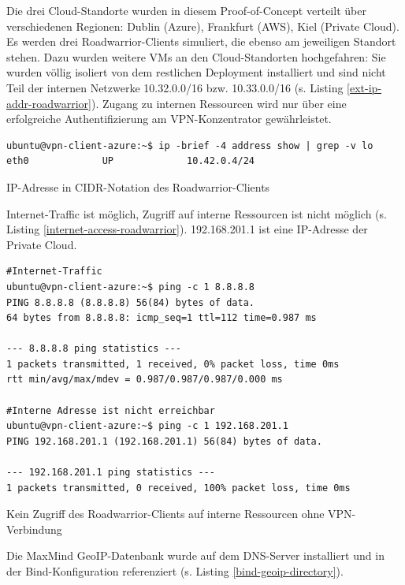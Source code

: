 Die drei Cloud-Standorte wurden in diesem Proof-of-Concept verteilt über verschiedenen Regionen: Dublin (Azure), Frankfurt (AWS), Kiel (Private Cloud). Es werden drei \gls{Roadwarrior}-\gls{Client}s simuliert, die ebenso am jeweiligen Standort stehen. Dazu wurden weitere \gls{VM}s an den Cloud-Standorten hochgefahren: Sie wurden völlig isoliert von dem restlichen \gls{Deployment} installiert und sind nicht Teil der internen Netzwerke 10.32.0.0/16 bzw. 10.33.0.0/16 (s. Listing \ref{ext-ip-addr-roadwarrior}). Zugang zu internen Ressourcen wird nur über eine erfolgreiche Authentifizierung am \gls{VPN-Konzentrator} gewährleistet.
\begin{listing}[h]
\begin{verbatim}
ubuntu@vpn-client-azure:~$ ip -brief -4 address show | grep -v lo
eth0             UP             10.42.0.4/24

\end{verbatim}
\caption{IP-Adresse in CIDR-Notation des Roadwarrior-Clients}
\label{ext-ip-addr-roadwarrior}
\end{listing}\FloatBarrier
Internet-Traffic ist möglich, Zugriff auf interne Ressourcen ist nicht möglich (s. Listing \ref{internet-access-roadwarrior}). 192.168.201.1 ist eine IP-Adresse der Private Cloud.
\begin{listing}[h]
\begin{verbatim}
#Internet-Traffic
ubuntu@vpn-client-azure:~$ ping -c 1 8.8.8.8
PING 8.8.8.8 (8.8.8.8) 56(84) bytes of data.
64 bytes from 8.8.8.8: icmp_seq=1 ttl=112 time=0.987 ms

--- 8.8.8.8 ping statistics ---
1 packets transmitted, 1 received, 0% packet loss, time 0ms
rtt min/avg/max/mdev = 0.987/0.987/0.987/0.000 ms

#Interne Adresse ist nicht erreichbar 
ubuntu@vpn-client-azure:~$ ping -c 1 192.168.201.1
PING 192.168.201.1 (192.168.201.1) 56(84) bytes of data.

--- 192.168.201.1 ping statistics ---
1 packets transmitted, 0 received, 100% packet loss, time 0ms

\end{verbatim}
\caption{Kein Zugriff des Roadwarrior-Clients auf interne Ressourcen ohne VPN-Verbindung}
\label{internet-access-roadwarrior}
\end{listing}\FloatBarrier
Die MaxMind \gls{GeoIP}-Datenbank wurde auf dem \gls{DNS}-Server installiert und in der Bind-Konfiguration referenziert (s. Listing \ref{bind-geoip-directory}).
